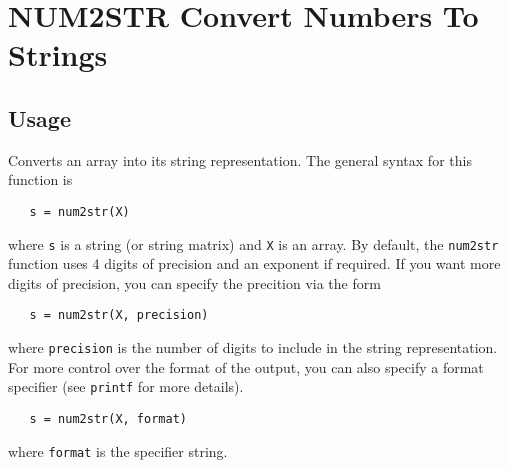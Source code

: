 \section{NUM2STR Convert Numbers To Strings}

\subsection{Usage}

Converts an array into its string representation.  The general syntax
for this function is
\begin{verbatim}
   s = num2str(X)
\end{verbatim}
where \verb|s| is a string (or string matrix) and \verb|X| is an array.  By
default, the \verb|num2str| function uses 4 digits of precision and an 
exponent if required.  If you want more digits of precision, you can 
specify the precition via the form
\begin{verbatim}
   s = num2str(X, precision)
\end{verbatim}
where \verb|precision| is the number of digits to include in the string
representation.  For more control over the format of the output, you 
can also specify a format specifier (see \verb|printf| for more details).
\begin{verbatim}
   s = num2str(X, format)
\end{verbatim}
where \verb|format| is the specifier string.
